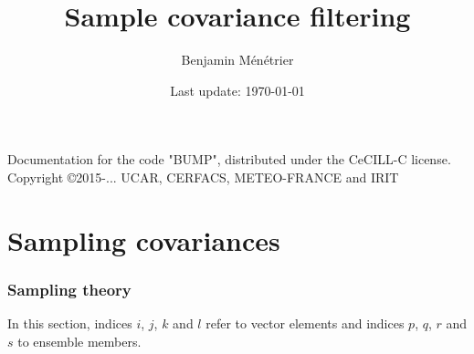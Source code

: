 \documentclass[12pt]{scrartcl}
\begin{document}
\title{Sample covariance filtering}
\author{Benjamin Ménétrier}
\date{Last update: \today}

\thispagestyle{empty}

\maketitle
\begin{center}
Documentation for the code "BUMP", distributed under the CeCILL-C license.\\
Copyright \copyright 2015-... UCAR, CERFACS, METEO-FRANCE and IRIT
\end{center}

\tableofcontents

\clearpage

\part{Sampling covariances}

\section{Sampling theory}

In this section, indices $i$, $j$, $k$ and $l$ refer to vector elements and indices $p$, $q$, $r$ and $s$ to ensemble members.
\end{document}
